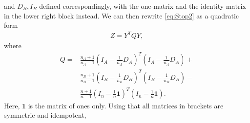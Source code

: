 \documentclass{article}
\theoremstyle{definition}
\theoremstyle{remark}
\begin{document}
and $D_B, I_B$ defined correspondingly, with the one-matrix and the identity matrix in the lower right block instead. We can then rewrite \eqref{eq:Stop2} as a quadratic form
\begin{align*}
	Z = Y^T Q Y,
\end{align*}
where
\begin{align*}
	Q = & \frac{n_A +1}{n_A -1} \left(I_A - \frac{1}{n_A} D_A\right)^T\left(I_A - \frac{1}{n_A} D_A\right) +       \\
	    & \frac{n_B +1}{n_B -1} \left(I_B - \frac{1}{n_B} D_B\right)^T\left(I_B - \frac{1}{n_B} D_B\right) -       \\
	    & \frac{n +1}{n -1} \left(I_n - \frac{1}{n} \mathbf{1} \right)^T\left(I_n - \frac{1}{n} \mathbf{1}\right).
\end{align*}
Here, $\mathbf{1}$ is the matrix of ones only. Using that all matrices in brackets are symmetric and idempotent,
\end{document}
